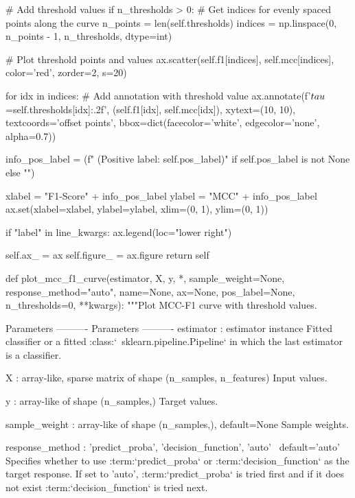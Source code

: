 \begin{pythoncode}
        # Add threshold values
        if n_thresholds > 0:
            # Get indices for evenly spaced points along the curve
            n_points = len(self.thresholds)
            indices = np.linspace(0, n_points - 1, n_thresholds, dtype=int)

            # Plot threshold points and values
            ax.scatter(self.f1[indices], self.mcc[indices],
                       color='red', zorder=2, s=20)

            for idx in indices:
                # Add annotation with threshold value
                ax.annotate(f'$\\tau$={self.thresholds[idx]:.2f}',
                            (self.f1[idx], self.mcc[idx]),
                            xytext=(10, 10), textcoords='offset points',
                            bbox=dict(facecolor='white', edgecolor='none', alpha=0.7))

        info_pos_label = (f" (Positive label: {self.pos_label})"
                          if self.pos_label is not None else "")

        xlabel = "F1-Score" + info_pos_label
        ylabel = "MCC" + info_pos_label
        ax.set(xlabel=xlabel, ylabel=ylabel, xlim=(0, 1), ylim=(0, 1))

        if "label" in line_kwargs:
            ax.legend(loc="lower right")

        self.ax_ = ax
        self.figure_ = ax.figure
        return self

def plot_mcc_f1_curve(estimator, X, y, *, sample_weight=None,
                      response_method="auto", name=None, ax=None,
                      pos_label=None, n_thresholds=0, **kwargs):
    """Plot MCC-F1 curve with threshold values.

    Parameters
    ----------
    Parameters
    ----------
    estimator : estimator instance
        Fitted classifier or a fitted :class:`~sklearn.pipeline.Pipeline`
        in which the last estimator is a classifier.

    X : {array-like, sparse matrix} of shape (n_samples, n_features)
        Input values.

    y : array-like of shape (n_samples,)
        Target values.

    sample_weight : array-like of shape (n_samples,), default=None
        Sample weights.

    response_method : {'predict_proba', 'decision_function', 'auto'} \
    default='auto'
        Specifies whether to use :term:`predict_proba` or
        :term:`decision_function` as the target response. If set to 'auto',
        :term:`predict_proba` is tried first and if it does not exist
        :term:`decision_function` is tried next.


\end{pythoncode}
